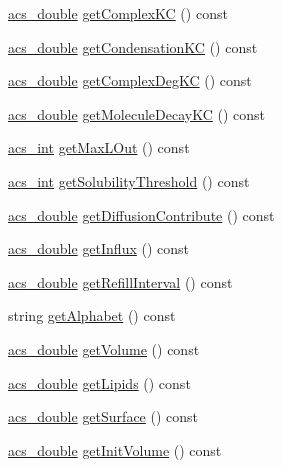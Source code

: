 \begin{DoxyCompactItemize}
\item 
\hyperlink{a00016_ab776853a005fcbf56af0424a2a4dd607}{acs\-\_\-double} \hyperlink{a00003_abf3168adf05ff9fa6bab4e34b387f0a6}{get\-Complex\-K\-C} () const 
\item 
\hyperlink{a00016_ab776853a005fcbf56af0424a2a4dd607}{acs\-\_\-double} \hyperlink{a00003_a7ac1b69dd38107d5c40339563969d09f}{get\-Condensation\-K\-C} () const 
\item 
\hyperlink{a00016_ab776853a005fcbf56af0424a2a4dd607}{acs\-\_\-double} \hyperlink{a00003_ae58bcd60ae01a8ba12f83c1328121c35}{get\-Complex\-Deg\-K\-C} () const 
\item 
\hyperlink{a00016_ab776853a005fcbf56af0424a2a4dd607}{acs\-\_\-double} \hyperlink{a00003_a4ed6ad35297e718398fb42a2b9dbe4ae}{get\-Molecule\-Decay\-K\-C} () const 
\item 
\hyperlink{a00016_a8d277355641a098190360234e2ebde35}{acs\-\_\-int} \hyperlink{a00003_a4c58b3ce555f04f009bcfb7bbc2b0000}{get\-Max\-L\-Out} () const 
\item 
\hyperlink{a00016_a8d277355641a098190360234e2ebde35}{acs\-\_\-int} \hyperlink{a00003_a6df38337d38f2f714be7058a2a31202c}{get\-Solubility\-Threshold} () const 
\item 
\hyperlink{a00016_ab776853a005fcbf56af0424a2a4dd607}{acs\-\_\-double} \hyperlink{a00003_a46193e153bd5dcc37fb35346cb7fd971}{get\-Diffusion\-Contribute} () const 
\item 
\hyperlink{a00016_ab776853a005fcbf56af0424a2a4dd607}{acs\-\_\-double} \hyperlink{a00003_a6f0b4481779cd12dbcd8155916c7d703}{get\-Influx} () const 
\item 
\hyperlink{a00016_ab776853a005fcbf56af0424a2a4dd607}{acs\-\_\-double} \hyperlink{a00003_a469a7ce80a1e9e5fae77b46b66dfee18}{get\-Refill\-Interval} () const 
\item 
string \hyperlink{a00003_add8478cfc878c3aa5a57b2a71357a088}{get\-Alphabet} () const 
\item 
\hyperlink{a00016_ab776853a005fcbf56af0424a2a4dd607}{acs\-\_\-double} \hyperlink{a00003_a355b53cbc86aaab2a6d114980162ac0e}{get\-Volume} () const 
\item 
\hyperlink{a00016_ab776853a005fcbf56af0424a2a4dd607}{acs\-\_\-double} \hyperlink{a00003_a99dbdcc260e6216741a1d9b9a36855f2}{get\-Lipids} () const 
\item 
\hyperlink{a00016_ab776853a005fcbf56af0424a2a4dd607}{acs\-\_\-double} \hyperlink{a00003_af2518db60035d2ab06a158164d86d156}{get\-Surface} () const 
\item 
\hyperlink{a00016_ab776853a005fcbf56af0424a2a4dd607}{acs\-\_\-double} \hyperlink{a00003_a3257b9ae05d12b11ffa40258acfa10a8}{get\-Init\-Volume} () const 

\end{DoxyCompactItemize}

